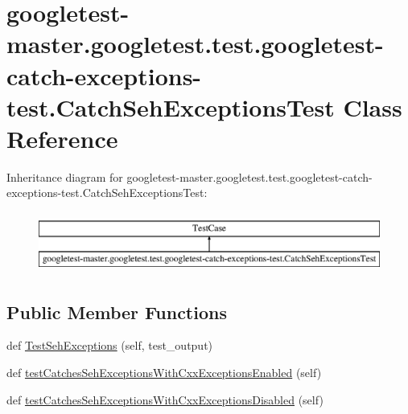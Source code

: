 \hypertarget{classgoogletest-master_1_1googletest_1_1test_1_1googletest-catch-exceptions-test_1_1_catch_seh_exceptions_test}{}\section{googletest-\/master.googletest.\+test.\+googletest-\/catch-\/exceptions-\/test.Catch\+Seh\+Exceptions\+Test Class Reference}
\label{classgoogletest-master_1_1googletest_1_1test_1_1googletest-catch-exceptions-test_1_1_catch_seh_exceptions_test}
Inheritance diagram for googletest-\/master.googletest.\+test.\+googletest-\/catch-\/exceptions-\/test.Catch\+Seh\+Exceptions\+Test\+:\begin{figure}[H]
\begin{center}
\leavevmode
\includegraphics[height=2.000000cm]{d9/dba/classgoogletest-master_1_1googletest_1_1test_1_1googletest-catch-exceptions-test_1_1_catch_seh_exceptions_test}
\end{center}
\end{figure}
\subsection*{Public Member Functions}
\begin{DoxyCompactItemize}
\item 
def \mbox{\hyperlink{classgoogletest-master_1_1googletest_1_1test_1_1googletest-catch-exceptions-test_1_1_catch_seh_exceptions_test_a26f39a99949e7d3c78e40c8bc56c127d}{Test\+Seh\+Exceptions}} (self, test\+\_\+output)
\item 
def \mbox{\hyperlink{classgoogletest-master_1_1googletest_1_1test_1_1googletest-catch-exceptions-test_1_1_catch_seh_exceptions_test_a4358f403fe70d245531f8adb030e1485}{test\+Catches\+Seh\+Exceptions\+With\+Cxx\+Exceptions\+Enabled}} (self)
\item 
def \mbox{\hyperlink{classgoogletest-master_1_1googletest_1_1test_1_1googletest-catch-exceptions-test_1_1_catch_seh_exceptions_test_a754dd4a97d8e49a6642c7b1ff42623b9}{test\+Catches\+Seh\+Exceptions\+With\+Cxx\+Exceptions\+Disabled}} (self)
\end{DoxyCompactItemize}



